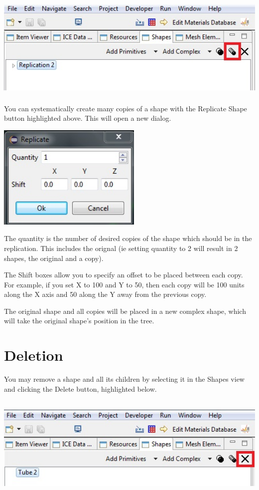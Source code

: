 \documentclass{article}
\begin{document}
\begin{center}
\includegraphics[height=5cm]{images/GeometryReplicateShape.jpg}
\end{center}

You can systematically create many copies of a shape with the Replicate Shape
button highlighted above. This will open a new dialog.

\begin{center}
\includegraphics[height=5cm]{images/GeometryReplicateDialog.jpg}
\end{center}

The quantity is the number of desired copies of the shape which should be in the
replication. This includes the orignal (ie setting quantity to 2 will result in
2 shapes, the original and a copy).

The Shift boxes allow you to specify an offset to be placed between each copy.
For example, if you set X to 100 and Y to 50, then each copy will be 100 units
along the X axis and 50 along the Y away from the previous copy. 

The original shape and all copies will be placed in a new complex shape, which
will take the original shape's position in the tree.

\section{Deletion}

You may remove a shape and all its children by selecting it in the Shapes view
and clicking the Delete button, highlighted below.

\begin{center}
\includegraphics[height=5cm]{images/GeometryDeleteButton.jpg}
\end{center}
\end{document}
